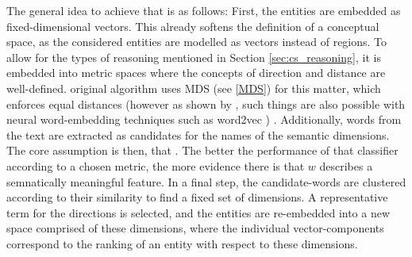 The general idea to achieve that is as follows: First, the entities %
are embedded as fixed-dimensional vectors. This already softens the definition of a conceptual space, as the considered entities are modelled as vectors instead of regions. %
To allow for the types of reasoning mentioned in Section \ref{sec:cs_reasoning}, %
it is embedded into metric spaces where the concepts of direction and distance are well-defined.  original algorithm uses MDS (see \ref{MDS}) for this matter, which enforces equal distances  %
(however as shown by \textcite{Mikolov:Regularities}, such things are also possible with neural word-embedding techniques such as word2vec \cite{Mikolov2013}) 
. Additionally, words from the text are extracted as candidates for the names of the semantic dimensions. The core assumption is then, that  \cite[3574]{Alshaikh2020}. The better the performance of that classifier according to a chosen metric, the more evidence there is that $w$ describes a semnatically meaningful feature. 
In a final step, the candidate-words are clustered according to their similarity to find a fixed set of dimensions. A representative term for the directions is selected, and the entities are re-embedded into a new space comprised of these dimensions, where the individual vector-components correspond to the ranking of an entity with respect to these dimensions.
\newline

